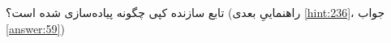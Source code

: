 \section{}
\paragraph{}\label{hint:355}
تابع سازنده کپی چگونه پیاده‌سازی شده است؟ (راهنماییِ بعدی \ref{hint:236}، جواب \ref{answer:59})